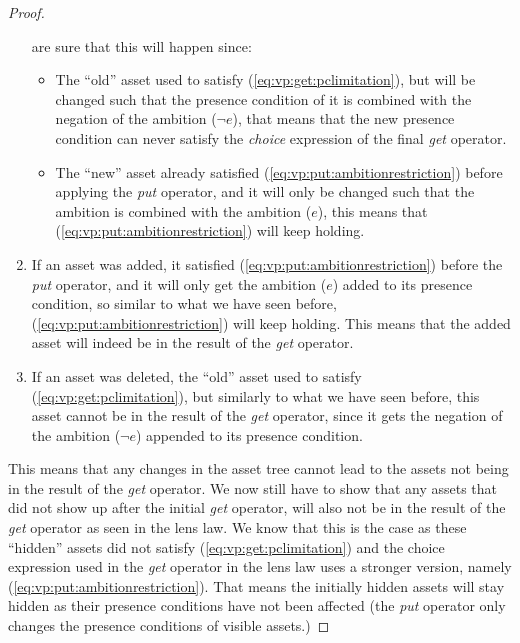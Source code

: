 \begin{proof}
\begin{enumerate}
          are sure that this will happen since:
          \begin{itemize}
            \item The ``old'' asset used to satisfy (\ref{eq:vp:get:pclimitation}),
                  but will be changed such that the presence condition of it is
                  combined with the negation of the ambition ($\neg e$), that
                  means that the new presence condition can never satisfy the
                  \emph{choice} expression of the final \emph{get} operator.
            \item The ``new'' asset already satisfied (\ref{eq:vp:put:ambitionrestriction})
                  before applying the \emph{put} operator, and it will only be
                  changed such that the ambition is combined with the ambition
                  ($e$), this means that (\ref{eq:vp:put:ambitionrestriction}) will
                  keep holding.
          \end{itemize}
    \item If an asset was added, it satisfied (\ref{eq:vp:put:ambitionrestriction})
          before the \emph{put} operator, and it will only get the ambition ($e$)
          added to its presence condition, so similar to what we have seen
          before, (\ref{eq:vp:put:ambitionrestriction}) will keep holding. This
          means that the added asset will indeed be in the result of the
          \emph{get} operator.
    \item If an asset was deleted, the ``old'' asset used to satisfy (\ref{eq:vp:get:pclimitation}),
          but similarly to what we have seen before, this asset cannot be in the
          result of the \emph{get} operator, since it gets the negation of the
          ambition ($\neg e$) appended to its presence condition.
  \end{enumerate}
  This means that any changes in the asset tree cannot lead to the assets not
  being in the result of the \emph{get} operator. We now still have to show that
  any assets that did not show up after the initial \emph{get} operator, will also
  not be in the result of the \emph{get} operator as seen in the lens law. We 
  know that this is the case as these ``hidden'' assets did not satisfy
  (\ref{eq:vp:get:pclimitation}) and the choice expression used in the \emph{get}
  operator in the lens law uses a stronger version, namely (\ref{eq:vp:put:ambitionrestriction}).
  That means the initially hidden assets will stay hidden as their presence
  conditions have not been affected (the \emph{put} operator only changes
  the presence conditions of visible assets.)


\end{proof}
